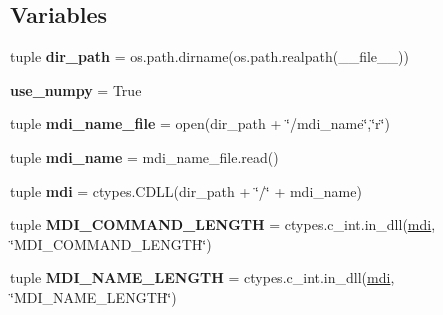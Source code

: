 \subsection*{Variables}
\begin{DoxyCompactItemize}
\item 
\hypertarget{namespacemolssi__driver__interface_1_1mdi__python_a4fe76654a72905e82612449524ef55dc}{tuple {\bfseries dir\-\_\-path} = os.\-path.\-dirname(os.\-path.\-realpath(\-\_\-\-\_\-file\-\_\-\-\_\-))}\label{namespacemolssi__driver__interface_1_1mdi__python_a4fe76654a72905e82612449524ef55dc}

\item 
\hypertarget{namespacemolssi__driver__interface_1_1mdi__python_ab025c9a16e9f267efd130328697a9df5}{{\bfseries use\-\_\-numpy} = True}\label{namespacemolssi__driver__interface_1_1mdi__python_ab025c9a16e9f267efd130328697a9df5}

\item 
\hypertarget{namespacemolssi__driver__interface_1_1mdi__python_afe4b7990b888b2843bef43df279a1d78}{tuple {\bfseries mdi\-\_\-name\-\_\-file} = open(dir\-\_\-path + \char`\"{}/mdi\-\_\-name\char`\"{},\char`\"{}r\char`\"{})}\label{namespacemolssi__driver__interface_1_1mdi__python_afe4b7990b888b2843bef43df279a1d78}

\item 
\hypertarget{namespacemolssi__driver__interface_1_1mdi__python_a314a552cb98f989c3ed1e2ca8d732cda}{tuple {\bfseries mdi\-\_\-name} = mdi\-\_\-name\-\_\-file.\-read()}\label{namespacemolssi__driver__interface_1_1mdi__python_a314a552cb98f989c3ed1e2ca8d732cda}

\item 
\hypertarget{namespacemolssi__driver__interface_1_1mdi__python_a7ec9777791d0870ee6b2ac8a92cd89c3}{tuple {\bfseries mdi} = ctypes.\-C\-D\-L\-L(dir\-\_\-path + \char`\"{}/\char`\"{} + mdi\-\_\-name)}\label{namespacemolssi__driver__interface_1_1mdi__python_a7ec9777791d0870ee6b2ac8a92cd89c3}

\item 
\hypertarget{namespacemolssi__driver__interface_1_1mdi__python_a051f941650b7ab874a92b77bcb9774bc}{tuple {\bfseries M\-D\-I\-\_\-\-C\-O\-M\-M\-A\-N\-D\-\_\-\-L\-E\-N\-G\-T\-H} = ctypes.\-c\-\_\-int.\-in\-\_\-dll(\hyperlink{classmdi}{mdi}, \char`\"{}M\-D\-I\-\_\-\-C\-O\-M\-M\-A\-N\-D\-\_\-\-L\-E\-N\-G\-T\-H\char`\"{})}\label{namespacemolssi__driver__interface_1_1mdi__python_a051f941650b7ab874a92b77bcb9774bc}

\item 
\hypertarget{namespacemolssi__driver__interface_1_1mdi__python_a74b887816e8d36643c37ba10742f2f5f}{tuple {\bfseries M\-D\-I\-\_\-\-N\-A\-M\-E\-\_\-\-L\-E\-N\-G\-T\-H} = ctypes.\-c\-\_\-int.\-in\-\_\-dll(\hyperlink{classmdi}{mdi}, \char`\"{}M\-D\-I\-\_\-\-N\-A\-M\-E\-\_\-\-L\-E\-N\-G\-T\-H\char`\"{})}\label{namespacemolssi__driver__interface_1_1mdi__python_a74b887816e8d36643c37ba10742f2f5f}


\end{DoxyCompactItemize}
